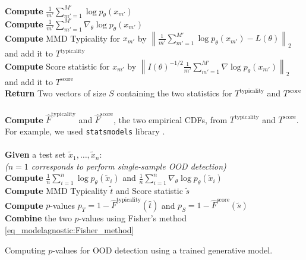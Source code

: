 {\begin{algorithm}[ht]
\begin{algorithmic}
\hspace{1.5em} \textbf{Compute} $\frac{1}{m'} \sum_{m'=1}^{M'}\log p_{\theta}({x}_{m'})$ \\
\hspace{1.5em} \textbf{Compute} $\frac{1}{m'} \sum_{m'=1}^{M'}\nabla_{{\theta}}\log p_{\theta}({x}_{m'})$ \\
\hspace{1.5em} \textbf{Compute} MMD Typicality for ${x}_{m'}$ by $\left\| \frac{1}{m'} \sum_{m'=1}^{M'}\log p_\theta ({x}_{m'}) - L(\theta) \right\|_2$ and add it to $T^{\text{typicality}}$\\
\hspace{1.5em} \textbf{Compute} Score statistic for ${x}_{m'}$ by $\left\|{I(\theta)}^{-1/2} \frac{1}{m'} \sum_{m'=1}^{M'}\nabla \log p_\theta ({x}_{m'})\right\|_2$ and add it to $T^{\text{score}}$\\
\textbf{Return} Two vectors of size $S$ containing the two statistics for $T^{\text{typicality}}$ and $T^{\text{score}}$  \\
\textbf{} \\
\textbf{Compute} $\hat{F}^{\text{typicality}}$ and $\hat{F}^{\text{score}}$, the two empirical CDFs, from $T^{\text{typicality}}$ and $T^{\text{score}}$. For example, we used \texttt{statsmodels} library \parencite{seabold_statsmodels_2010}. \\
\textbf{} \\  
\textbf{Given} a test set $\tilde{x}_1, \dots, \tilde{x}_n$:\\
\textit{($n=1$ corresponds to perform single-sample OOD detection)} \\ 
\hspace{1.5em} \textbf{Compute} $\frac{1}{n} \sum_{i=1}^{n}\log p_{\theta}(\tilde{{x}}_i)$ and $\frac{1}{n} \sum_{i=1}^{n}\nabla_{{\theta}}\log p_{\theta}(\tilde{{x}}_i)$ \\
\hspace{1.5em} \textbf{Compute} MMD Typicality $\tilde{t}$ and Score statistic $\tilde{s}$ \\
\hspace{1.5em} \textbf{Compute} $p$-values $p_{T} = 1 - \hat{F}^{\text{typicality}}(\hat{t})$ and $p_{S} = 1 - \hat{F}^{\text{score}}(\tilde{s})$ \\
\hspace{1.5em} \textbf{Combine} the two $p$-values using Fisher's method \cref{eq_modelagnostic:Fisher_method}
\end{algorithmic}
\caption{Computing $p$-values for OOD detection using a trained generative model.}
\label{alg_modelagnostic:algo_description}
\end{algorithm}

}